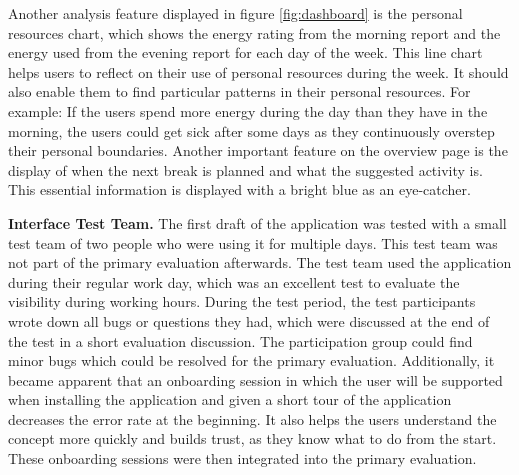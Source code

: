 \documentclass{hasel_thesis}
\begin{document}
Another analysis feature displayed in figure \ref{fig:dashboard} is the personal resources chart, which shows the energy rating from the morning report and the energy used from the evening report for each day of the week. This line chart helps users to reflect on their use of personal resources during the week. It should also enable them to find particular patterns in their personal resources. For example: If the users spend more energy during the day than they have in the morning, the users could get sick after some days as they continuously overstep their personal boundaries. Another important feature on the overview page is the display of when the next break is planned and what the suggested activity is. This essential information is displayed with a bright blue as an eye-catcher.

\textbf{Interface Test Team.} The first draft of the application was tested with a small test team of two people who were using it for multiple days. This test team was not part of the primary evaluation afterwards. The test team used the application during their regular work day, which was an excellent test to evaluate the visibility during working hours. During the test period, the test participants wrote down all bugs or questions they had, which were discussed at the end of the test in a short evaluation discussion. The participation group could find minor bugs which could be resolved for the primary evaluation. Additionally, it became apparent that an onboarding session in which the user will be supported when installing the application and given a short tour of the application decreases the error rate at the beginning. It also helps the users understand the concept more quickly and builds trust, as they know what to do from the start. These onboarding sessions were then integrated into the primary evaluation.
\end{document}
